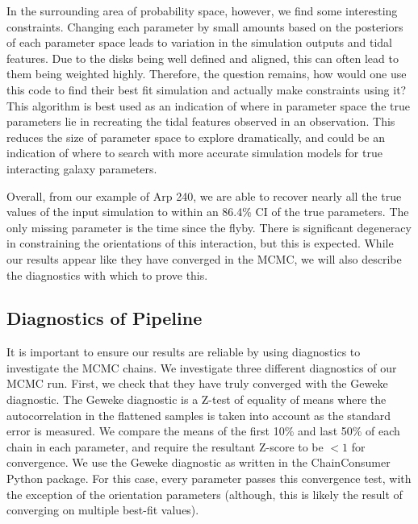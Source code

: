 In the surrounding area of probability space, however, we find some interesting constraints. Changing each parameter by small amounts based on the posteriors of each parameter space leads to variation in the simulation outputs and tidal features. Due to the disks being well defined and aligned, this can often lead to them being weighted highly. Therefore, the question remains, how would one use this code to find their best fit simulation and actually make constraints using it? This algorithm is best used as an indication of where in parameter space the true parameters lie in recreating the tidal features observed in an observation. This reduces the size of parameter space to explore dramatically, and could be an indication of where to search with more accurate simulation models for true interacting galaxy parameters.

Overall, from our example of Arp 240, we are able to recover nearly all the true values of the input simulation to within an 86.4\% CI of the true parameters. The only missing parameter is the time since the flyby. There is significant degeneracy in constraining the orientations of this interaction, but this is expected. While our results appear like they have converged in the MCMC, we will also describe the diagnostics with which to prove this. 

\subsection{Diagnostics of Pipeline}
\noindent It is important to ensure our results are reliable by using diagnostics to investigate the MCMC chains. We investigate three different diagnostics of our MCMC run. First, we check that they have truly converged with the Geweke diagnostic. The Geweke diagnostic is a Z-test of equality of means where the autocorrelation in the flattened samples is taken into account as the standard error is measured. We compare the means of the first 10\% and last 50\% of each chain in each parameter, and require the resultant Z-score to be $<1$ for convergence. We use the Geweke diagnostic as written in the ChainConsumer \citep{2016JOSS....1...45H} Python package. For this case, every parameter passes this convergence test, with the exception of the orientation parameters (although, this is likely the result of converging on multiple best-fit values).

